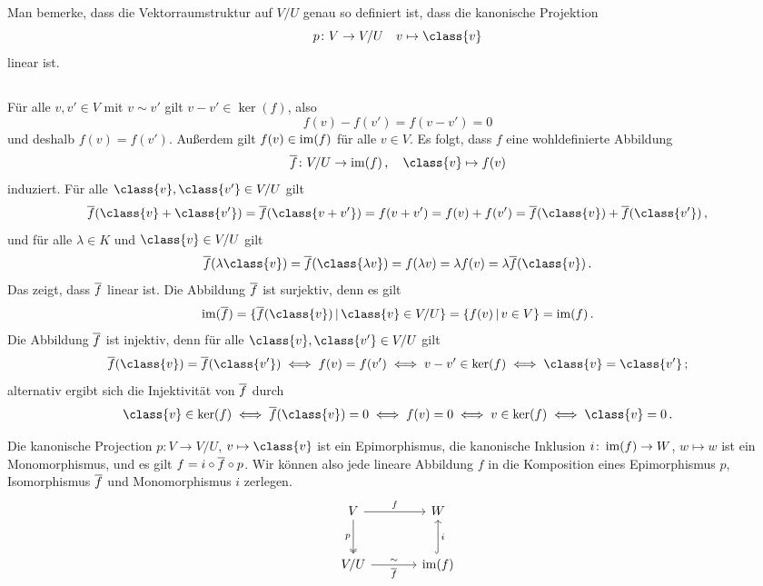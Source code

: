 Man bemerke, dass die Vektorraumstruktur auf $V\!/U$ genau so definiert ist, dass die kanonische Projektion
\[
          p
  \colon  V
  \to     V\!/U
  \quad   v
  \mapsto \class{v}
\]
linear ist.



\subsection{}

Für alle $v, v' \in V$ mit $v \sim v'$ gilt $v - v' \in \ker(f)$, also
\[
    f(v) - f(v')
  = f(v - v')
  = 0
\]
und deshalb $f(v) = f(v')$.
Außerdem gilt $f(v) \in \operatorname{im}(f)$ für alle $v \in V$.
Es folgt, dass $f$ eine wohldefinierte Abbildung
\[
          \induced{f}
  \colon  V\!/U
  \to     \im(f) \,,
  \quad   \class{v}
  \mapsto f(v)
\]
induziert.
Für alle $\class{v}, \class{v'} \in V\!/U$ gilt
\[
    \induced{f}(\class{v} + \class{v'})
  = \induced{f}(\class{v + v'})
  = f(v + v')
  = f(v) + f(v')
  = \induced{f}(\class{v}) + \induced{f}(\class{v'}) \,,
\]
und für alle $\lambda \in K$ und $\class{v} \in V\!/U$ gilt
\[
    \induced{f}(\lambda \class{v})
  = \induced{f}(\class{\lambda v})
  = f(\lambda v)
  = \lambda f(v)
  = \lambda \induced{f}(\class{v}) \,.
\]
Das zeigt, dass $\overline{f}$ linear ist.
Die Abbildung $\overline{f}$ ist surjektiv, denn es gilt
\[
    \im(\induced{f})
  = \{ \induced{f}(\class{v}) \suchthat \class{v} \in V\!/U \}
  = \{ f(v) \suchthat v \in V \}
  = \im(f) \,.
\]
Die Abbildung $\overline{f}$ ist injektiv, denn für alle $\class{v}, \class{v'} \in V\!/U$ gilt
\[
        \induced{f}(\class{v})  = \induced{f}(\class{v'})
  \iff  f(v)  = f(v')
  \iff  v - v' \in \ker(f)
  \iff  \class{v} = \class{v'} \,;
\]
alternativ ergibt sich die Injektivität von $\overline{f}$ durch
\[
        \class{v} \in \ker(f)
  \iff  \induced{f}(\class{v}) = 0
  \iff  f(v) = 0
  \iff  v \in \ker(f)
  \iff  \class{v} = 0 \,.
\]

\begin{remark}
  Die kanonische Projection $p \colon V \to V\!/U$, $v \mapsto \class{v}$ ist ein Epimorphismus, die kanonische Inklusion $i \colon \operatorname{im}(f) \to W$, $w \mapsto w$ ist ein Monomorphismus, und es gilt $f = i \circ \overline{f} \circ p$.
  Wir können also jede lineare Abbildung $f$ in die Komposition eines Epimorphismus $p$, Isomorphismus $\overline{f}$ und Monomorphismus $i$ zerlegen.
  \[
    \begin{tikzcd}[sep = large]
        V
        \arrow{r}[above]{f}
        \arrow[twoheadrightarrow]{d}[left]{p}
      & W
      \\
        V\!/U
        \arrow{r}[above]{\sim}[below]{\induced{f}}
      & \im(f)
        \arrow[hook]{u}[right]{i}
    \end{tikzcd}
  \]
\end{remark}


